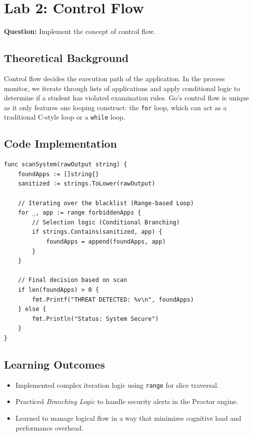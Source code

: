 \documentclass[12pt,a4paper]{article}
\begin{document}
\newpage
\section{Lab 2: Control Flow}
\textbf{Question:} Implement the concept of control flow.

\subsection{Theoretical Background}
Control flow decides the execution path of the application. In the process monitor, we iterate through lists of applications and apply conditional logic to determine if a student has violated examination rules. Go's control flow is unique as it only features one looping construct: the \texttt{for} loop, which can act as a traditional C-style loop or a \texttt{while} loop.

\subsection{Code Implementation}
\begin{lstlisting}
func scanSystem(rawOutput string) {
    foundApps := []string{}
    sanitized := strings.ToLower(rawOutput)

    // Iterating over the blacklist (Range-based Loop)
    for _, app := range forbiddenApps {
        // Selection logic (Conditional Branching)
        if strings.Contains(sanitized, app) {
            foundApps = append(foundApps, app)
        }
    }

    // Final decision based on scan
    if len(foundApps) > 0 {
        fmt.Printf("THREAT DETECTED: %v\n", foundApps)
    } else {
        fmt.Println("Status: System Secure")
    }
}
\end{lstlisting}

\subsection{Learning Outcomes}
\begin{itemize}
    \item Implemented complex iteration logic using \texttt{range} for slice traversal.
    \item Practiced \textit{Branching Logic} to handle security alerts in the Proctor engine.
    \item Learned to manage logical flow in a way that minimizes cognitive load and performance overhead.
\end{itemize}
\end{document}
